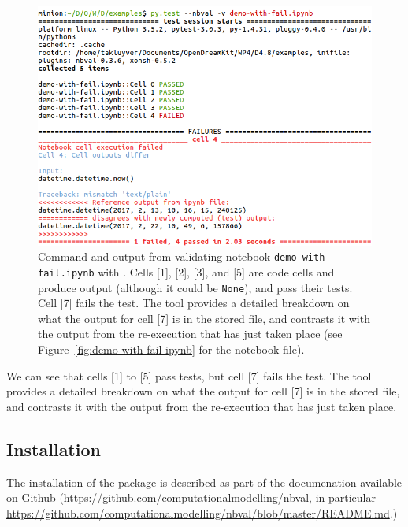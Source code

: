 \documentclass{deliverablereport}
\begin{document}
\begin{figure}[ht]
  \centering
  \includegraphics[width=1\textwidth]{examples/demo-with-fail-pytest.png}
  \caption{\nbval Command and output from validating notebook
    \texttt{demo-with-fail.ipynb} with \nbval. Cells [1], [2], [3],
    and [5] are code cells and produce output (although it could be
    \texttt{None}), and pass their tests. Cell [7] fails the test. The
    tool provides a detailed breakdown on what the output for cell [7]
    is in the stored file, and contrasts it with the output from the
    re-execution that has just taken place (see
    Figure~\ref{fig:demo-with-fail-ipynb} for the notebook
    file).\label{fig:demo-with-fail-pytest}}
\end{figure}

We can see that cells [1] to [5] pass tests, but cell [7] fails the test. The
tool provides a detailed breakdown on what the output for cell [7]
is in the stored file, and contrasts it with the output from the
re-execution that has just taken place.


\clearpage
\subsection{Installation}\label{sec:installation}
The installation of the package is described as part of the
documenation available on Github
(https://github.com/computationalmodelling/nbval, in particular\linebreak
\href{https://github.com/computationalmodelling/nbval/blob/master/README.md}{https://github.com/computationalmodelling/nbval/blob/master/README.md}.)
\end{document}
